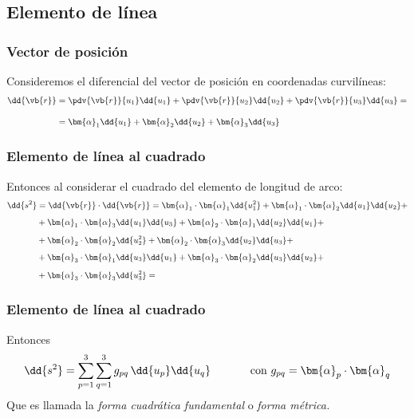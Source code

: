 \subsection{Elemento de línea}
\begin{frame}
\frametitle{Vector de posición}
Consideremos el diferencial del vector de posición en coordenadas curvilíneas:
\begin{align*}
\dd{\vb{r}} &= \pdv{\vb{r}}{u_{1}} \dd{u_{1}} + \pdv{\vb{r}}{u_{2}} \dd{u_{2}} + \pdv{\vb{r}}{u_{3}} \dd{u_{3}} = \\[1em]
&= \bm{\alpha}_{1} \dd{u_{1}} + \bm{\alpha}_{2} \dd{u_{2}} + \bm{\alpha}_{3} \dd{u_{3}}
\end{align*}
\end{frame}
\begin{frame}
\frametitle{Elemento de línea al cuadrado}
Entonces al considerar el cuadrado del elemento de longitud de arco:
\begin{align*}
\dd{s^{2}} &= \dd{\vb{r}} \cdot \dd{\vb{r}} = \bm{\alpha}_{1} \cdot \bm{\alpha}_{1} \dd{u_{1}^{2}} + \bm{\alpha}_{1} \cdot \bm{\alpha}_{2} \dd{u_{1}} \dd{u_{2}} + \\[0.5em]
&+ \bm{\alpha}_{1} \cdot \bm{\alpha}_{3} \dd{u_{1}} \dd{u_{3}} + \bm{\alpha}_{2} \cdot \bm{\alpha}_{1} \dd{u_{2}} \dd{u_{1}} + \\[0.5em]
&+ \bm{\alpha}_{2} \cdot \bm{\alpha}_{2} \dd{u_{2}^{2}} + \bm{\alpha}_{2} \cdot \bm{\alpha}_{3} \dd{u_{2}} \dd{u_{3}} + \\[0.5em]
&+ \bm{\alpha}_{3} \cdot \bm{\alpha}_{1} \dd{u_{3}} \dd{u_{1}} + \bm{\alpha}_{3} \cdot \bm{\alpha}_{2} \dd{u_{3}} \dd{u_{2}} + \\[0.5em]
&+ \bm{\alpha}_{3} \cdot \bm{\alpha}_{3} \dd{u_{3}^{2}} =
\end{align*}
\end{frame}
\begin{frame}
\frametitle{Elemento de línea al cuadrado}
Entonces
\begin{align*}
\dd{s^{2}} = \sum_{p=1}^{3} \sum_{q=1}^{3} g_{pq} \, \dd{u_{p}} \dd{u_{q}} \hspace{1.25cm} \mbox{con } g_{p q} = \bm{\alpha}_{p} \cdot \bm{\alpha}_{q}
\end{align*}
\pause
Que es llamada la \emph{forma cuadrática fundamental} o \emph{forma métrica.}
\end{frame}
